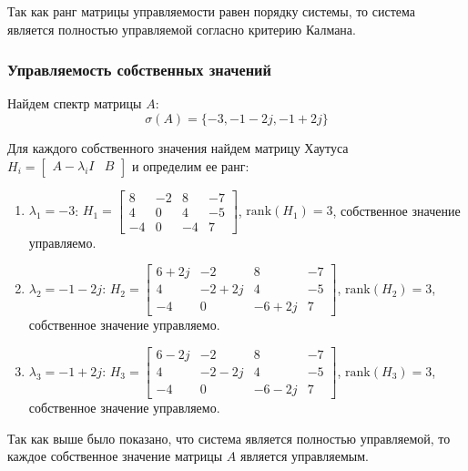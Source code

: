 Так как ранг матрицы управляемости равен порядку системы, то система является полностью управляемой согласно критерию Калмана.

\subsubsection{Управляемость собственных значений}
Найдем спектр матрицы $A$:
\begin{equation}
    \sigma(A) = \{-3, -1-2j, -1+2j\}
\end{equation}

Для каждого собственного значения найдем матрицу Хаутуса $H_i = \begin{bmatrix} A - \lambda_i I & B \end{bmatrix}$ и определим ее ранг:
\begin{enumerate}
    \item $\lambda_1 = -3$: $H_1 = \begin{bmatrix}
        8 & -2 & 8 & -7\\
        4 & 0 & 4 & -5 \\
        -4 & 0 & -4 & 7
    \end{bmatrix}$, $\text{rank}(H_1) = 3$, собственное значение управляемо.
    \item $\lambda_2 = -1-2j$: $H_2 = \begin{bmatrix}
        6+2j & -2 & 8 & -7\\
        4 & -2+2j & 4 & -5 \\
        -4 & 0 & -6+2j & 7
    \end{bmatrix}$, $\text{rank}(H_2) = 3$, собственное значение управляемо.
    \item $\lambda_3 = -1+2j$: $H_3 = \begin{bmatrix}
        6-2j & -2 & 8 & -7\\
        4 & -2-2j & 4 & -5 \\
        -4 & 0 & -6-2j & 7
    \end{bmatrix}$, $\text{rank}(H_3) = 3$, собственное значение управляемо.
\end{enumerate}
Так как выше было показано, что система является полностью управляемой, то каждое собственное значение матрицы $A$ является управляемым. 


